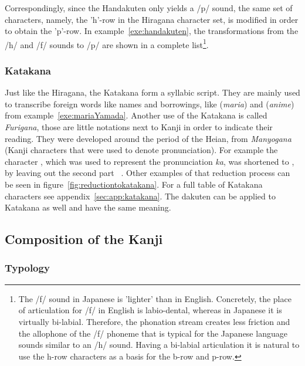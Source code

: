 Correspondingly, since the Handakuten only yields a /p/ sound, 
the same set of characters, namely, the 'h'-row in the Hiragana character set, 
is modified in order to obtain the 'p'-row. 
In example~\ref{exe:handakuten}, the transformations
from the /h/ and /f/ sounds to /p/ are shown in a complete list\footnote{
The /f/ sound in Japanese is 'lighter' than in English. Concretely, the place of
articulation for /f/ in English is labio-dental, whereas in Japanese it is 
virtually bi-labial. Therefore, the phonation stream creates less friction and
the allophone of the /f/ phoneme that is typical for the Japanese language sounds
similar to an /h/ sound. Having a bi-labial articulation it is natural to use 
the h-row characters as a basis for the b-row and p-row.}.

\subsubsection{Katakana }
\label{sec:katakana}

Just like the Hiragana, the Katakana form a syllabic script. They are mainly used
to transcribe foreign words like names and borrowings, like 
(\emph{maria}) and  (\emph{anime}) from 
example~\ref{exe:mariaYamada}. Another use of the Katakana is called 
\emph{Furigana}, those are little notations next to Kanji in order to 
indicate their reading. They were developed around the period of the Heian, from 
\emph{Manyogana} (Kanji characters that were used to denote pronunciation).
For example the character , which was used to represent the pronunciation
\emph{ka}, was shortened to , by leaving out the second part 
~. Other examples of that reduction process
can be seen in figure~\ref{fig:reductiontokatakana}. For a full table of 
Katakana characters see appendix~\ref{sec:app:katakana}. The dakuten can be 
applied to Katakana as well and have the same meaning.

\subsection{Composition of the Kanji }
\label{sec:compositionofKanji}

\subsubsection{Typology}
\label{sec:typologyoftheKanji}

